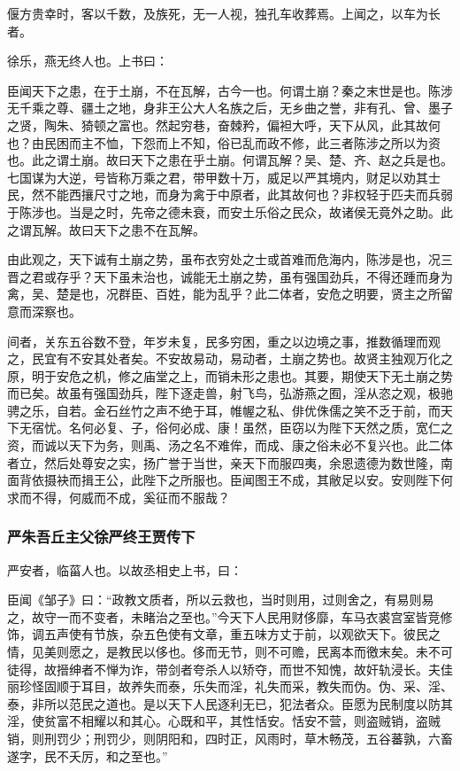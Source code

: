 \documentclass[]{article}
\begin{document}
偃方贵幸时，客以千数，及族死，无一人视，独孔车收葬焉。上闻之，以车为长者。

徐乐，燕无终人也。上书曰：

臣闻天下之患，在于土崩，不在瓦解，古今一也。何谓土崩？秦之末世是也。陈涉无千乘之尊、疆土之地，身非王公大人名族之后，无乡曲之誉，非有孔、曾、墨子之贤，陶朱、猗顿之富也。然起穷巷，奋棘矜，偏袒大呼，天下从风，此其故何也？由民困而主不恤，下怨而上不知，俗已乱而政不修，此三者陈涉之所以为资也。此之谓土崩。故曰天下之患在乎土崩。何谓瓦解？吴、楚、齐、赵之兵是也。七国谋为大逆，号皆称万乘之君，带甲数十万，威足以严其境内，财足以劝其士民，然不能西攘尺寸之地，而身为禽于中原者，此其故何也？非权轻于匹夫而兵弱于陈涉也。当是之时，先帝之德未衰，而安土乐俗之民众，故诸侯无竟外之助。此之谓瓦解。故曰天下之患不在瓦解。

由此观之，天下诚有土崩之势，虽布衣穷处之士或首难而危海内，陈涉是也，况三晋之君或存乎？天下虽未治也，诚能无土崩之势，虽有强国劲兵，不得还踵而身为禽，吴、楚是也，况群臣、百姓，能为乱乎？此二体者，安危之明要，贤主之所留意而深察也。

间者，关东五谷数不登，年岁未复，民多穷困，重之以边境之事，推数循理而观之，民宜有不安其处者矣。不安故易动，易动者，土崩之势也。故贤主独观万化之原，明于安危之机，修之庙堂之上，而销未形之患也。其要，期使天下无土崩之势而已矣。故虽有强国劲兵，陛下逐走兽，射飞鸟，弘游燕之囿，淫从恣之观，极驰骋之乐，自若。金石丝竹之声不绝于耳，帷幄之私、俳优侏儒之笑不乏于前，而天下无宿忧。名何必复、子，俗何必成、康！虽然，臣窃以为陛下天然之质，宽仁之资，而诚以天下为务，则禹、汤之名不难侔，而成、康之俗未必不复兴也。此二体者立，然后处尊安之实，扬广誉于当世，亲天下而服四夷，余恩遗德为数世隆，南面背依摄袂而揖王公，此陛下之所服也。臣闻图王不成，其敝足以安。安则陛下何求而不得，何威而不成，奚征而不服哉？

\hypertarget{header-n4877}{%
\subsubsection{严朱吾丘主父徐严终王贾传下}\label{header-n4877}}

严安者，临菑人也。以故丞相史上书，曰：

臣闻《邹子》曰：``政教文质者，所以云救也，当时则用，过则舍之，有易则易之，故守一而不变者，未睹治之至也。''今天下人民用财侈靡，车马衣裘宫室皆竞修饰，调五声使有节族，杂五色使有文章，重五味方丈于前，以观欲天下。彼民之情，见美则愿之，是教民以侈也。侈而无节，则不可赡，民离本而徼末矣。未不可徒得，故搢绅者不惮为诈，带剑者夸杀人以矫夺，而世不知愧，故奸轨浸长。夫佳丽珍怪固顺于耳目，故养失而泰，乐失而淫，礼失而采，教失而伪。伪、采、淫、泰，非所以范民之道也。是以天下人民逐利无已，犯法者众。臣愿为民制度以防其淫，使贫富不相耀以和其心。心既和平，其性恬安。恬安不营，则盗贼销，盗贼销，则刑罚少；刑罚少，则阴阳和，四时正，风雨时，草木畅茂，五谷蕃孰，六畜遂字，民不夭厉，和之至也。''
\end{document}
